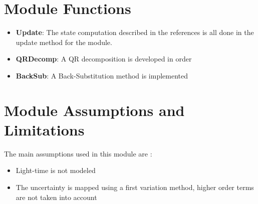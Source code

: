 

\section{Module Functions}
\begin{itemize}
	\item \textbf{Update}: The state computation described in the references is all done in the update method for the module.
	\item \textbf{QRDecomp}: A QR decomposition is developed in order
	\item \textbf{BackSub}: A Back-Substitution method is implemented 
\end{itemize}

\section{Module Assumptions and Limitations}

The main assumptions used in this module are :

\begin{itemize}
\item Light-time is not modeled
\item The uncertainty is mapped using a first variation method, higher order terms are not taken into account
\end{itemize}